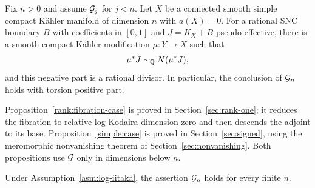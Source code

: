 \begin{proposition}\label{simple:case}
Fix \(n>0\) and assume \(\mathcal G_j\) for \(j<n\). Let \(X\) be a connected
smooth simple compact Kähler manifold of dimension \(n\) with \(a(X)=0\).
For a rational SNC boundary \(B\) with coefficients in \([0,1]\) and
\(J=K_X+B\) pseudo-effective,
there is a smooth compact Kähler modification \(\mu:Y\to X\) such that
\[
 \mu^*J\sim_{\mathbb Q}N(\mu^*J),
\]
and this negative part is a rational divisor. In particular, the conclusion
of \(\mathcal G_n\) holds with torsion positive part.
\end{proposition}

Proposition~\ref{rank:fibration-case} is proved in
Section~\ref{sec:rank-one}; it reduces the fibration to relative log Kodaira
dimension zero and then descends the adjoint to its base.
Proposition~\ref{simple:case} is proved in Section~\ref{sec:signed}, using
the meromorphic nonvanishing theorem of Section~\ref{sec:nonvanishing}.
Both propositions use \(\mathcal G\) only in dimensions below \(n\).

\begin{theorem}
\label{thm:good-decomposition}
Under Assumption~\ref{asm:log-iitaka}, the assertion \(\mathcal G_n\) holds
for every finite \(n\).
\end{theorem}

